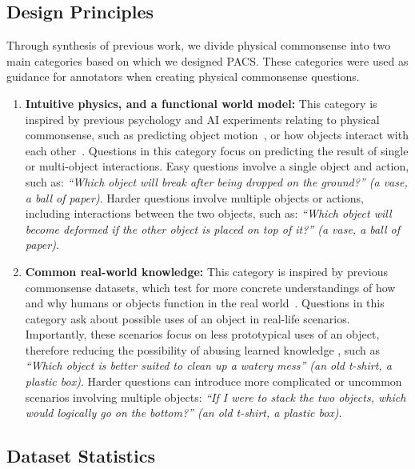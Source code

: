 \documentclass[runningheads]{llncs}
\newcommand{\names}{\textsc{PACS}}
\begin{document}
\subsection{Design Principles}
\label{subsec:design}


Through synthesis of previous work, we divide physical commonsense into two main categories based on which we designed \names. These categories were used as guidance for annotators when creating physical commonsense questions.
\begin{enumerate}
    \item \textbf{Intuitive physics, and a functional world model:} This category is inspired by previous psychology and AI experiments relating to physical commonsense, such as predicting object motion~\cite{kaiser1986intuitivephysics,kim2001intuitivephysics,smith2013physics,wu2015physics}, or how objects interact with each other~\cite{hespos2016objects}. Questions in this category focus on predicting the result of single or multi-object interactions. Easy questions involve a single object and action, such as: \textit{``Which object will break after being dropped on the ground?'' (\textcolor{gg}{a vase}, a ball of paper)}. Harder questions involve multiple objects or actions, including interactions between the two objects, such as: \textit{``Which object will become deformed if the other object is placed on top of it?'' (a vase, \textcolor{gg}{a ball of paper})}.
    \item \textbf{Common real-world knowledge:} This category is inspired by previous commonsense datasets, which test for more concrete understandings of how and why humans or objects function in the real world~\cite{bisk2020piqa,Forbes2019DoNL,zadeh2019socialiq,zellers2019vcr}. Questions in this category ask about possible uses of an object in real-life scenarios. Importantly, these scenarios focus on less prototypical uses of an object, therefore reducing the possibility of abusing learned knowledge \cite{bisk2020piqa}, such as \textit{``Which object is better suited to clean up a watery mess'' (\textcolor{gg}{an old t-shirt}, a plastic box)}. Harder questions can introduce more complicated or uncommon scenarios involving multiple objects: \textit{``If I were to stack the two objects, which would logically go on the bottom?'' (an old t-shirt, \textcolor{gg}{a plastic box})}.
\end{enumerate}

\subsection{Dataset Statistics}
\end{document}
